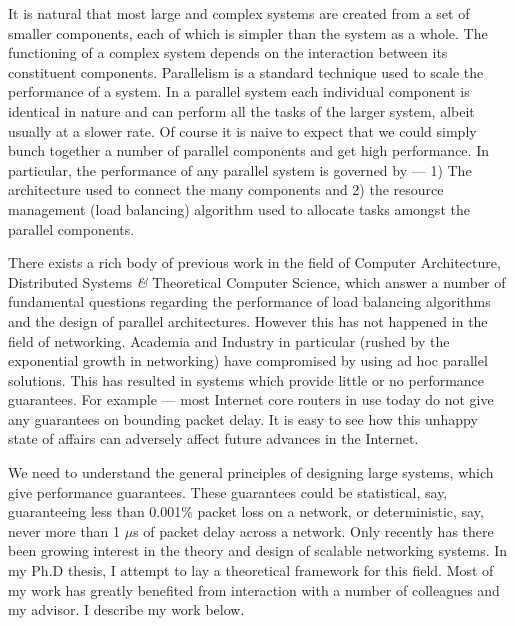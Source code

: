 \documentclass[a4paper, 10pt]{article}
\begin{document}
\begin{small}

It is natural that most large and complex systems are created from a set 
of smaller components, each of which is simpler than the system as a whole. 
The functioning of a complex system depends on the interaction between its 
constituent components. Parallelism is a standard technique used to scale the
performance of a system. In a parallel system each individual component is 
identical in nature and can perform all the tasks of the larger system, 
albeit usually at a slower rate. Of course it is naive to expect that
we could simply bunch together a number of parallel components and get high performance.
In particular, the performance of any parallel system is governed by --- 1) The
architecture used to connect the many components and 2) the 
resource management (load balancing) algorithm used to 
allocate tasks amongst the parallel components. 



There exists a rich body of previous work in the field of Computer Architecture, 
Distributed Systems {\it \&}  Theoretical Computer Science, which answer a number of 
fundamental questions regarding the performance of load balancing algorithms and 
the design of parallel architectures.
However this has not happened in the field of networking. 
Academia and Industry in particular (rushed by the exponential growth in networking) 
have compromised by using ad hoc parallel solutions. This has resulted in systems
which provide little or no performance guarantees.
For example --- most Internet core routers in use today do not give any 
guarantees on bounding packet delay.
It is easy to see how this unhappy state of affairs can adversely affect 
future advances in the Internet.

We need to understand the general principles of designing large systems,
which give performance guarantees. These guarantees could be statistical, say, guaranteeing less
than 0.001\% packet loss on a network, or deterministic, say, never more than 1 $\mu$s of packet
delay across a network. Only recently has there been growing interest in the 
theory and design of scalable networking systems.
In my Ph.D thesis, I attempt to lay a theoretical framework for this field.
Most of my work has greatly benefited from interaction with a number of colleagues and my advisor.
I describe my work below.


\end{small}
\end{document}
